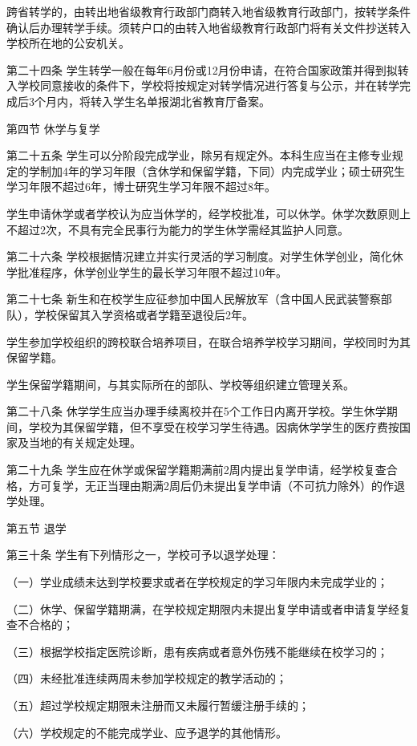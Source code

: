 \documentclass[UTF8,12pt,a4paper]{report}
\begin{document}
跨省转学的，由转出地省级教育行政部门商转入地省级教育行政部门，按转学条件确认后办理转学手续。须转户口的由转入地省级教育行政部门将有关文件抄送转入学校所在地的公安机关。

第二十四条  学生转学一般在每年6月份或12月份申请，在符合国家政策并得到拟转入学校同意接收的条件下，学校将按规定对转学情况进行答复与公示，并在转学完成后3个月内，将转入学生名单报湖北省教育厅备案。

第四节 休学与复学

第二十五条 学生可以分阶段完成学业，除另有规定外。本科生应当在主修专业规定的学制加4年的学习年限（含休学和保留学籍，下同）内完成学业；硕士研究生学习年限不超过6年，博士研究生学习年限不超过8年。

   学生申请休学或者学校认为应当休学的，经学校批准，可以休学。休学次数原则上不超过2次，不具有完全民事行为能力的学生休学需经其监护人同意。

第二十六条 学校根据情况建立并实行灵活的学习制度。对学生休学创业，简化休学批准程序，休学创业学生的最长学习年限不超过10年。

第二十七条 新生和在校学生应征参加中国人民解放军（含中国人民武装警察部队），学校保留其入学资格或者学籍至退役后2年。

学生参加学校组织的跨校联合培养项目，在联合培养学校学习期间，学校同时为其保留学籍。

学生保留学籍期间，与其实际所在的部队、学校等组织建立管理关系。

第二十八条 休学学生应当办理手续离校并在5个工作日内离开学校。学生休学期间，学校为其保留学籍，但不享受在校学习学生待遇。因病休学学生的医疗费按国家及当地的有关规定处理。

第二十九条 学生应在休学或保留学籍期满前2周内提出复学申请，经学校复查合格，方可复学，无正当理由期满2周后仍未提出复学申请（不可抗力除外）的作退学处理。

第五节 退学

第三十条 学生有下列情形之一，学校可予以退学处理：

（一）学业成绩未达到学校要求或者在学校规定的学习年限内未完成学业的；

（二）休学、保留学籍期满，在学校规定期限内未提出复学申请或者申请复学经复查不合格的；

（三）根据学校指定医院诊断，患有疾病或者意外伤残不能继续在校学习的；

（四）未经批准连续两周未参加学校规定的教学活动的；

（五）超过学校规定期限未注册而又未履行暂缓注册手续的；

（六）学校规定的不能完成学业、应予退学的其他情形。
\end{document}
